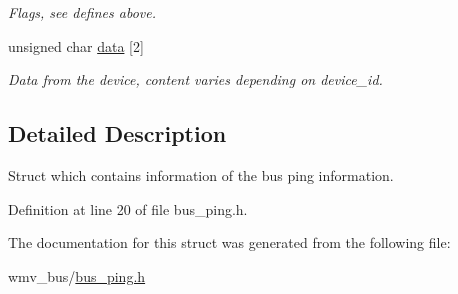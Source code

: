 \begin{CompactItemize}
\begin{CompactList}\small\item\em Flags, see defines above. \item\end{CompactList}\item 
\hypertarget{structbus__struct__ping__status_1c62266668b9359a8267f84c250d29b7}{
unsigned char \hyperlink{structbus__struct__ping__status_1c62266668b9359a8267f84c250d29b7}{data} \mbox{[}2\mbox{]}}
\label{structbus__struct__ping__status_1c62266668b9359a8267f84c250d29b7}

\begin{CompactList}\small\item\em Data from the device, content varies depending on device\_\-id. \item\end{CompactList}\end{CompactItemize}


\subsection{Detailed Description}
Struct which contains information of the bus ping information. 

Definition at line 20 of file bus\_\-ping.h.

The documentation for this struct was generated from the following file:\begin{CompactItemize}
\item 
wmv\_\-bus/\hyperlink{bus__ping_8h}{bus\_\-ping.h}\end{CompactItemize}
